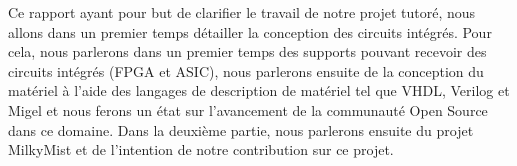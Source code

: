 Ce rapport ayant pour but de clarifier le travail de notre projet tutoré, nous allons
dans un premier temps détailler la conception des circuits intégrés.  Pour cela, nous parlerons
dans un premier temps des supports pouvant recevoir des circuits intégrés (FPGA et ASIC),
nous parlerons ensuite de la conception du matériel à l'aide des langages de
description de matériel tel que VHDL, Verilog et Migel et nous ferons un état sur
l'avancement de la communauté Open Source dans ce domaine.  Dans la deuxième partie,
nous parlerons ensuite du projet MilkyMist et de l'intention de notre contribution
sur ce projet.
